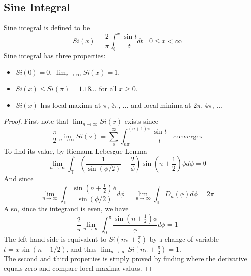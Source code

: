 \documentclass[12pt]{article}
\begin{document}
\subsection*{Sine Integral}
Sine integral is defined to be
\[
Si(x) = \frac{2}{\pi}\int_{0}^{x}\frac{\sin t}{t}dt \ \ \ \ \text{$0 \leqslant x < \infty$}
\]
Sine integral has three properties:
\begin{itemize}
\item $Si(0) = 0$, $\lim_{x\rightarrow \infty} Si(x) = 1$.
\item $Si(x) \leqslant Si(\pi) = 1.18...$ for all $x \geqslant 0$.
\item $Si(x)$ has local maxima at $\pi$, $3\pi$, ... and local minima at $2\pi$, $4\pi$, ...
\end{itemize}  
\begin{proof}
First note that $\lim_{n\rightarrow\infty} Si(x)$ exists since 
\[\frac{\pi}{2}\lim_{n\rightarrow\infty} Si(x) = \sum_0^\infty \int_{n\pi}^{(n+1)\pi}\frac{\sin t}{t}\ \ \ \ \text{converges}\]
To find its value, by Riemann Lebesgue Lemma
\[
\lim_{n\rightarrow\infty}\int_{\mathbb{T}} (\frac{1}{\sin(\phi/2)}-\frac{2}{\phi})\sin(n+\frac{1}{2})\phi d\phi = 0
\]
And since 
\[
\lim_{n\rightarrow\infty}\int_{\mathbb{T}} \frac{\sin(n+\frac{1}{2})\phi}{\sin(\phi/2)}d\phi = \lim_{n\rightarrow\infty}\int_{\mathbb{T}} D_n(\phi)d\phi = 2\pi
\]
Also, since the integrand is even, we have 
\[
\frac{2}{\pi}\lim_{n\rightarrow\infty}\int_{0}^{\pi}\frac{\sin(n+\frac{1}{2})\phi}{\phi} d\phi = 1
\]
The left hand side is equivalent to $Si(n\pi + \frac{\pi}{2})$ by a change of variable $t = x\sin(n+1/2)$, and thus $\lim_{n \rightarrow \infty}Si(n\pi + \frac{\pi}{2}) = 1$.\\
The second and third properties is simply proved by finding where the derivative equals zero and compare local maxima values.
\end{proof}
\end{document}
